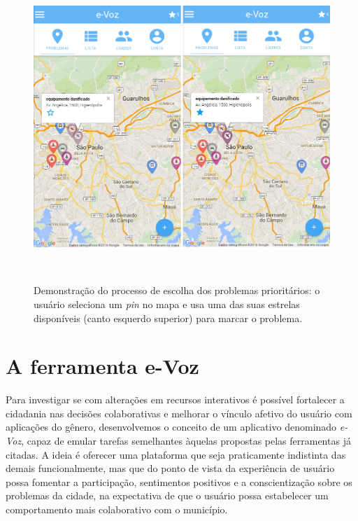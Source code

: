 \documentclass{sigchi}
\begin{document}
\begin{figure}
	\centering
	\includegraphics[width=0.9\columnwidth]{figures/prototipo1a}
	\caption{Demonstração do processo de escolha dos problemas prioritários: o usuário seleciona um \textit{pin} no mapa e usa uma das suas estrelas disponíveis (canto esquerdo superior) para marcar o problema. }~\label{fig:figure1}
\end{figure}

\section{A ferramenta e-Voz}
Para investigar se com alterações em recursos interativos é possível fortalecer a cidadania nas decisões colaborativas e melhorar o vínculo afetivo do usuário com aplicações do gênero, desenvolvemos o conceito de um aplicativo denominado \textit{e-Voz}, capaz de emular tarefas semelhantes àquelas propostas pelas ferramentas já citadas. A ideia é oferecer uma plataforma que seja praticamente indistinta das demais funcionalmente, mas que do ponto de vista da experiência de usuário possa fomentar a participação, sentimentos positivos e a conscientização sobre os problemas da cidade, na expectativa de que o usuário possa estabelecer um comportamento mais colaborativo com o município.
\end{document}
